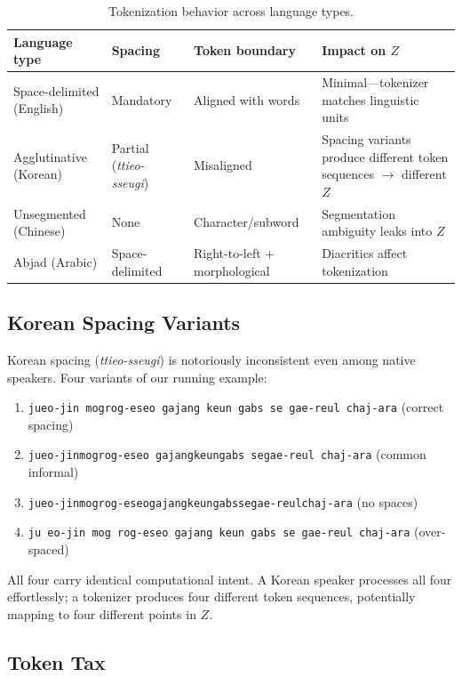 \documentclass{article}
\theoremstyle{definition}
\begin{document}
\begin{table}[h]
\centering
\caption{Tokenization behavior across language types.}
\label{tab:tokenization}
\small
\begin{tabularx}{\textwidth}{l l l L}
\toprule
\textbf{Language type} & \textbf{Spacing} & \textbf{Token boundary} & \textbf{Impact on $Z$} \\
\midrule
Space-delimited (English) & Mandatory & Aligned with words & Minimal---tokenizer matches linguistic units \\
Agglutinative (Korean) & Partial (\emph{ttieo-sseugi}) & Misaligned & Spacing variants produce different token sequences $\to$ different $Z$ \\
Unsegmented (Chinese) & None & Character/subword & Segmentation ambiguity leaks into $Z$ \\
Abjad (Arabic) & Space-delimited & Right-to-left + morphological & Diacritics affect tokenization \\
\bottomrule
\end{tabularx}
\end{table}

\subsection{Korean Spacing Variants}

Korean spacing (\emph{ttieo-sseugi}) is notoriously inconsistent even among native speakers. Four variants of our running example:

\begin{enumerate}[nosep]
  \item \texttt{jueo-jin mogrog-eseo gajang keun gabs se gae-reul chaj-ara} (correct spacing)
  \item \texttt{jueo-jinmogrog-eseo gajangkeungabs segae-reul chaj-ara} (common informal)
  \item \texttt{jueo-jinmogrog-eseogajangkeungabssegae-reulchaj-ara} (no spaces)
  \item \texttt{ju eo-jin mog rog-eseo gajang keun gabs se gae-reul chaj-ara} (over-spaced)
\end{enumerate}

All four carry identical computational intent. A Korean speaker processes all four effortlessly; a tokenizer produces four different token sequences, potentially mapping to four different points in $Z$.

\subsection{Token Tax}
\end{document}
